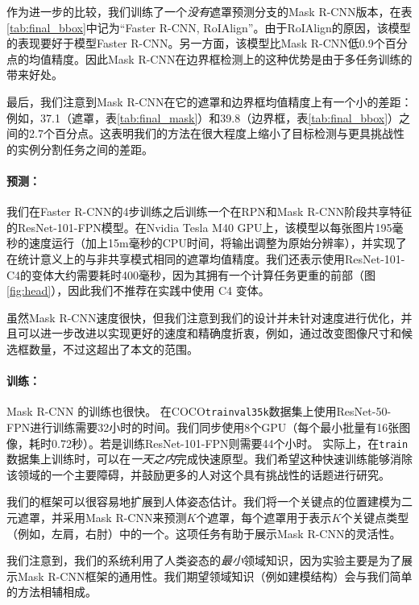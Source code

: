 作为进一步的比较，我们训练了一个\emph{没有}遮罩预测分支的Mask R-CNN版本，在表\ref{tab:final_bbox}中记为``Faster R-CNN, RoIAlign''。由于RoIAlign的原因，该模型的表现要好于模型Faster R-CNN。另一方面，该模型比Mask R-CNN低0.9个百分点的均值精度。因此Mask R-CNN在边界框检测上的这种优势是由于多任务训练的带来好处。

最后，我们注意到Mask R-CNN在它的遮罩和边界框均值精度上有一个小的差距：例如，37.1（遮罩，表\ref{tab:final_mask}）和39.8（边界框，表\ref{tab:final_bbox}）之间的2.7个百分点。这表明我们的方法在很大程度上缩小了目标检测与更具挑战性的实例分割任务之间的差距。


\paragraph{预测：} 我们在Faster R-CNN的4步训练之后训练一个在RPN和Mask R-CNN阶段共享特征的ResNet-101-FPN模型。在Nvidia Tesla M40 GPU上，该模型以每张图片195毫秒的速度运行（加上15m毫秒的CPU时间，将输出调整为原始分辨率），并实现了在统计意义上的与非共享模式相同的遮罩均值精度。我们还表示使用ResNet-101-C4的变体大约需要耗时400毫秒，因为其拥有一个计算任务更重的前部（图\ref{fig:head}），因此我们不推荐在实践中使用 C4 变体。

虽然Mask R-CNN速度很快，但我们注意到我们的设计并未针对速度进行优化，并且可以进一步改进以实现更好的速度和精确度折衷，例如，通过改变图像尺寸和候选框数量，不过这超出了本文的范围。

\paragraph{训练：} Mask R-CNN 的训练也很快。 在COCO\texttt{trainval35k}数据集上使用ResNet-50-FPN进行训练需要32小时的时间。我们同步使用8个GPU（每个最小批量有16张图像，耗时0.72秒）。若是训练ResNet-101-FPN则需要44个小时。 实际上，在\texttt{train}数据集上训练时，可以在\emph{一天之内}完成快速原型。我们希望这种快速训练能够消除该领域的一个主要障碍，并鼓励更多的人对这个具有挑战性的话题进行研究。

\label{sec:keypoints}

我们的框架可以很容易地扩展到人体姿态估计。我们将一个关键点的位置建模为二元遮罩，并采用Mask R-CNN来预测$K$个遮罩，每个遮罩用于表示$K$个关键点类型（例如，左肩，右肘）中的一个。这项任务有助于展示Mask R-CNN的灵活性。

我们注意到，我们的系统利用了人类姿态的\emph{最小}领域知识，因为实验主要是为了展示Mask R-CNN框架的通用性。我们期望领域知识（例如建模结构）会与我们简单的方法相辅相成。

